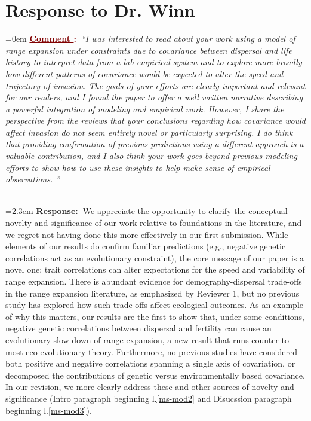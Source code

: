 \documentclass[12pt]{article}
\newcounter{cN}
\newcommand{\comment}[1]{
	\vspace{2em}
	\refstepcounter{cN} %
	\noindent \hangindent=0em \textbf{\textcolor{Maroon}{\uline{Comment \thecN}:~}}\emph{``#1''}
	}
\newcommand{\response}[1]{
	\\[0.25em]
	\hangindent=2.3em \textbf{\textcolor{NavyBlue}{\uline{Response}:~}}#1
	}
\begin{document}
\section{Response to Dr. Winn}
\vspace{-2em}

\comment{I was interested to read about your work using a model of range expansion under constraints due to covariance between dispersal and life history to interpret data from a lab empirical system and to explore more broadly how different patterns of covariance would be expected to alter the speed and trajectory of invasion.
The goals of your efforts are clearly important and relevant for our readers, and I found the paper to offer a well written narrative describing a powerful integration of modeling and empirical work.
However, I share the perspective from the reviews that your conclusions regarding how covariance would affect invasion do not seem entirely novel or particularly surprising.
I do think that providing confirmation of previous predictions using a different approach is a valuable contribution, and I also think your work goes beyond previous modeling efforts to show how to use these insights to help make sense of empirical observations. }
\response{We appreciate the opportunity to clarify the conceptual novelty and significance of our work relative to foundations in the literature, and we regret not having done this more effectively in our first submission.
While elements of our results do confirm familiar predictions (e.g., negative genetic correlations act as an evolutionary constraint), the core message of our paper is a novel one: trait correlations can alter expectations for the speed and variability of range expansion.
There is abundant evidence for demography-dispersal trade-offs in the range expansion literature, as emphasized by Reviewer 1, but no previous study has explored how such trade-offs affect ecological outcomes.
As an example of why this matters, our results are the first to show that, under some conditions, negative genetic correlations between dispersal and fertility can cause an evolutionary slow-down of range expansion, a new result that runs counter to most eco-evolutionary theory.
Furthermore, no previous studies have considered both positive and negative correlations spanning a single axis of covariation, or decomposed the contributions of genetic versus environmentally based covariance.
In our revision, we more clearly address these and other sources of novelty and significance (Intro paragraph beginning l.\ref{ms-mod2} and Disucssion paragraph beginning l.\ref{ms-mod3}).}
\end{document}

